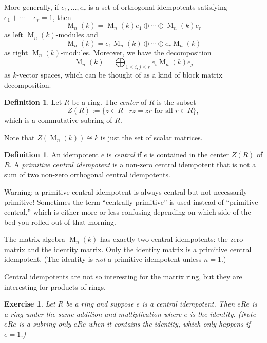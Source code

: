 \documentclass[12pt]{article}
\theoremstyle{plain}
\newtheorem{exercise}[theorem]{Exercise}
\theoremstyle{definition}
\newtheorem{definition}[theorem]{Definition}
\theoremstyle{remark}
\numberwithin{equation}{section}
\begin{document}
More generally, if $e_1,\ldots,e_r$ is a set of orthogonal
idempotents satisfying $e_1+\cdots+e_r=1$, then
\[
\operatorname{M}_n(k) = \operatorname{M}_n(k)e_1
\oplus \cdots \oplus \operatorname{M}_n(k)e_r
\]
as left $\operatorname{M}_n(k)$-modules and
\[
\operatorname{M}_n(k) = e_1\operatorname{M}_n(k)
\oplus \cdots \oplus e_r\operatorname{M}_n(k)
\]
as right $\operatorname{M}_n(k)$-modules.
Moreover, we have the decomposition
\[
\operatorname{M}_n(k) = \bigoplus_{1\le i,j \le r}
e_i\operatorname{M}_n(k)e_j
\]
as $k$-vector spaces, which can be thought of as a kind of block matrix
decomposition.

\begin{definition}
Let $R$ be a ring.
The \emph{center} of $R$ is the subset
\[
Z(R) := \{ z \in R \mid rz=zr \textrm{ for all } r \in R \},
\]
which is a commutative subring of $R$.
\end{definition}

Note that $Z(\operatorname{M}_n(k)) \cong k$ is just the set of scalar
matrices.

\begin{definition}
An idempotent $e$ is \emph{central} if $e$ is contained in the center
$Z(R)$ of $R$.
A \emph{primitive central idempotent} is a non-zero central idempotent
that is not a sum of two non-zero orthogonal central idempotents.
\end{definition}

Warning: a primitive central idempotent is always central
but not necessarily primitive!
Sometimes the term ``centrally primitive'' is used
instead of ``primitive central,'' which is either more or less confusing
depending on which side of the bed you rolled out of that morning.

The matrix algebra $\operatorname{M}_n(k)$ has exactly two central
idempotents: the zero matrix and the identity matrix.
Only the identity matrix is a primitive central idempotent.
(The identity is \emph{not} a primitive idempotent unless $n=1$.)

Central idempotents are not so interesting for the matrix ring, but they
are interesting for products of rings.

\begin{exercise}
Let $R$ be a ring and suppose $e$ is a central idempotent.
Then $eRe$ is a ring under the same addition and multiplication
where $e$ is the identity.
(Note $eRe$ is a subring only $eRe$ when it contains the
identity, which only happens if $e=1$.)
\end{exercise}
\end{document}
